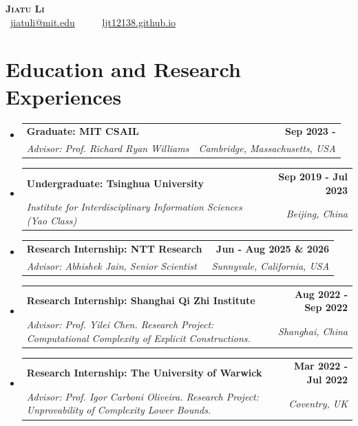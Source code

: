 \documentclass[a4paper, 11pt]{article}
\makeatletter
\newcommand{\resumeSubheading}[4]{
  \vspace{-2pt}\item
    \begin{tabular*}{1.0\textwidth}[t]{l@{\extracolsep{\fill}}r}
      \textbf{#1} & \textbf{\small #2} \\
      \textit{\small#3} & \textit{\small #4} \\
    \end{tabular*}\vspace{-7pt}
}
\newcommand{\resumeSubHeadingListStart}{\begin{itemize}[leftmargin=0.0in, label={}]}
\newcommand{\resumeSubHeadingListEnd}{\end{itemize}}
\makeatother
\begin{document}

\begin{center}
    {\Huge \bfseries \scshape \textcolor{accent}{Jiatu Li}} \\ \vspace{4pt}
    {\small \faEnvelope\ \href{mailto:jiatuli@mit.edu}{jiatuli@mit.edu} \ \ {\color{accent}\textbullet}\ \  \faGlobe\ \href{https://ljt12138.github.io/}{ljt12138.github.io}}
    \vspace{-6pt}
\end{center}

\section{Education and Research Experiences}
  \resumeSubHeadingListStart
    \resumeSubheading
      {Graduate: MIT CSAIL}{Sep 2023 - }
      {Advisor: Prof. Richard Ryan Williams}{Cambridge, Massachusetts, USA}
    \resumeSubheading
      {Undergraduate: Tsinghua University}{Sep 2019 - Jul 2023}
      {Institute for Interdisciplinary Information Sciences (Yao Class)}{Beijing, China}

    \resumeSubheading
      {Research Internship: NTT Research}{Jun - Aug 2025 \& 2026}
      {Advisor: Abhishek Jain, Senior Scientist}{Sunnyvale, California, USA}
    
  
    \resumeSubheading
      {Research Internship: Shanghai Qi Zhi Institute}{Aug 2022 - Sep 2022}
      {Advisor: Prof. Yilei Chen. Research Project: Computational Complexity of Explicit Constructions.}{Shanghai, China}
    \resumeSubheading
      {Research Internship: The University of Warwick}{Mar 2022 - Jul 2022}
      {Advisor: Prof. Igor Carboni Oliveira. Research Project: Unprovability of Complexity Lower Bounds.}{Coventry, UK}
\resumeSubHeadingListEnd
\end{document}
